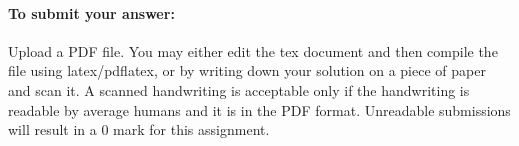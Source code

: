 \documentclass{article}
\begin{document}
\bigskip

\paragraph{To submit your answer:} Upload a PDF file. You may either edit the tex document and then compile the file using latex/pdflatex, or by writing down your solution on a piece of paper and scan it. A scanned handwriting is acceptable only if the handwriting is readable by average humans and it is in the PDF format. Unreadable submissions will result in a $0$ mark for this assignment.
\end{document}
